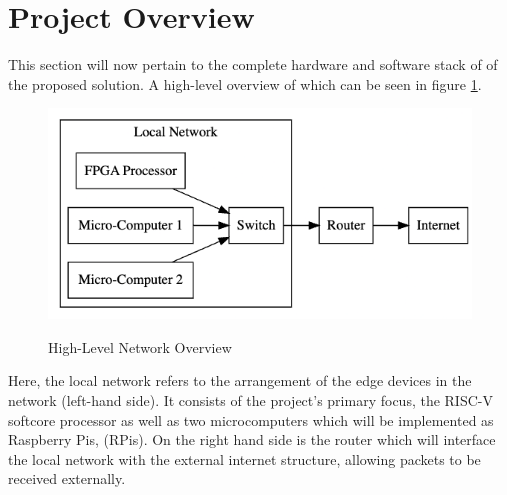 \section{Project Overview}
\label{sec:Project Overview}
This section will now pertain to the complete hardware and software stack of of the proposed solution. A high-level overview of which can be seen in figure \ref{Fig:1}.

\begin{figure}[h]
    \begin{center}
    \caption{High-Level Network Overview}
    \includegraphics[width=1.0\textwidth]{./Figures/Network_Overview.png}
    \label{Fig:1}
    \end{center}
\end{figure}

Here, the local network refers to the arrangement of the edge devices in the network (left-hand side). It consists of the project's primary focus, the RISC-V softcore processor as well as two microcomputers which will be implemented as Raspberry Pis, (RPis). On the right hand side is the router which will interface the local network with the external internet structure, allowing packets to be received externally.

